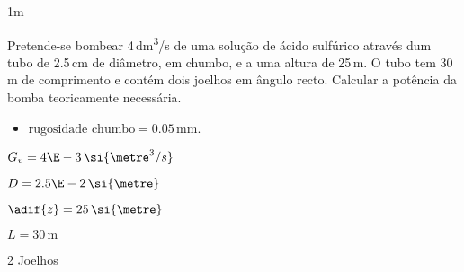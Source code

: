 \documentclass[\mainfilename]{subfiles}
\begin{document}
\begin{questionBox}1m{} %
    
    Pretende-se bombear 4\,\si{\deci\metre^3/\second} de uma solução de ácido sulfúrico através dum tubo de 2.5\,\si{\centi\metre} de diâmetro, em chumbo, e a uma altura de 25\,\si{\metre}. O tubo tem 30\,\si{\metre} de comprimento e contém dois joelhos em ângulo recto. Calcular a potência da bomba teoricamente necessária. 
    \begin{itemize}
        \item \(\text{rugosidade chumbo} = 0.05\,\si{\milli\metre}\).
    \end{itemize}

    \vspace{1ex}

    \begin{itemize}
        \begin{multicols}{3}
            \item \( G_v = 4\E-3\,\si{\metre^3/s} \)
            \item \( D = 2.5\E-2\,\si{\metre} \)
            \item \( \adif{z} = 25\,\si{\metre} \)
            \item \( L = 30\,\si{\metre} \)
            \item 2 Joelhos 
        \end{multicols}
    \end{itemize}


\end{questionBox}
\end{document}

